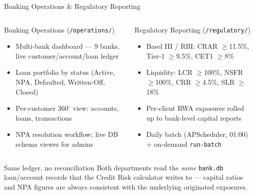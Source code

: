 \documentclass[9pt,aspectratio=169]{beamer}
\begin{document}
\begin{frame}{Banking Operations \& Regulatory Reporting}
\vspace{-2pt}
\begin{columns}[T]
    \begin{block}{Banking Operations (\texttt{/operations/})}
      \footnotesize
      \begin{itemize}\setlength\itemsep{3pt}
        \item[\small$\bullet$] Multi-bank dashboard --- 9 banks, live customer/account/loan ledger
        \item[\small$\bullet$] Loan portfolio by status (Active, NPA, Defaulted, Written-Off, Closed)
        \item[\small$\bullet$] Per-customer 360$^\circ$ view: accounts, loans, transactions
        \item[\small$\bullet$] NPA resolution workflow; live DB schema viewer for admins
      \end{itemize}
    \end{block}
    \begin{block}{Regulatory Reporting (\texttt{/regulatory/})}
      \footnotesize
      \begin{itemize}\setlength\itemsep{3pt}
        \item[\small$\bullet$] Basel III / RBI: CRAR $\geq$11.5\%, Tier-1 $\geq$9.5\%, CET1 $\geq$8\%
        \item[\small$\bullet$] Liquidity: LCR $\geq$100\%, NSFR $\geq$100\%, CRR $\geq$4.5\%, SLR $\geq$18\%
        \item[\small$\bullet$] Per-client RWA exposures rolled up to bank-level capital reports
        \item[\small$\bullet$] Daily batch (APScheduler, 01:00) + on-demand \texttt{run-batch}
      \end{itemize}
    \end{block}
\end{columns}
\vspace{6pt}
\begin{alertblock}{Same ledger, no reconciliation}
  \footnotesize
  Both departments read the \emph{same} \texttt{bank.db} loan/account records that the Credit Risk
  calculator writes to --- capital ratios and NPA figures are always consistent with the
  underlying originated exposures.
\end{alertblock}
\end{frame}
\end{document}
